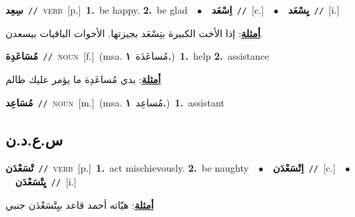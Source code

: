 \documentclass[10pt,a4paper,twoside]{article} %
\begin{document}
\begin{multicols}{2}
{\setlength\topsep{0pt}\textbf{\foreignlanguage{arabic}{سِعِد}}\ {\color{gray}\texttt{//}\color{black}}\ \textsc{verb}\ [p.]\ \textbf{1.}~be happy.  \textbf{2.}~be glad\ \ $\bullet$\ \ \setlength\topsep{0pt}\textbf{\foreignlanguage{arabic}{اِسْعَد}}\ {\color{gray}\texttt{//}\color{black}}\ [c.]\ \ $\bullet$\ \ \setlength\topsep{0pt}\textbf{\foreignlanguage{arabic}{يِسْعَد}}\ {\color{gray}\texttt{//}\color{black}}\ [i.]\  \begin{flushright}\color{gray}\foreignlanguage{arabic}{\textbf{\underline{\foreignlanguage{arabic}{أمثلة}}}: إذا الأخت الكبيرة بتِسْعَد بجيزتها. الأخوات الباقيات بيسعدن.}\end{flushright}\color{black}} \vspace{2mm}

{\setlength\topsep{0pt}\textbf{\foreignlanguage{arabic}{مُسَاعَدِة}}\ {\color{gray}\texttt{//}\color{black}}\ \textsc{noun}\ [f.]\ \color{gray}(msa. \foreignlanguage{arabic}{مُساعَدَة}~\foreignlanguage{arabic}{\textbf{١.}})\color{black}\ \textbf{1.}~help  \textbf{2.}~assistance\  \begin{flushright}\color{gray}\foreignlanguage{arabic}{\textbf{\underline{\foreignlanguage{arabic}{أمثلة}}}: بدي مُساعَدِة ما يؤمر عليك ظالم}\end{flushright}\color{black}} \vspace{2mm}

{\setlength\topsep{0pt}\textbf{\foreignlanguage{arabic}{مُسَاعِد}}\ {\color{gray}\texttt{//}\color{black}}\ \textsc{noun}\ [m.]\ \color{gray}(msa. \foreignlanguage{arabic}{مُساعِد}~\foreignlanguage{arabic}{\textbf{١.}})\color{black}\ \textbf{1.}~assistant\ } \vspace{2mm}

\vspace{-3mm}
\subsection*{\color{blue}\foreignlanguage{arabic}{س.ع.د.ن}\color{blue}{}} 

{\setlength\topsep{0pt}\textbf{\foreignlanguage{arabic}{تْسَعْدَن}}\ {\color{gray}\texttt{//}\color{black}}\ \textsc{verb}\ [p.]\ \textbf{1.}~act mischievously.  \textbf{2.}~be naughty\ \ $\bullet$\ \ \setlength\topsep{0pt}\textbf{\foreignlanguage{arabic}{اِتْسَعْدَن}}\ {\color{gray}\texttt{//}\color{black}}\ [c.]\ \ $\bullet$\ \ \setlength\topsep{0pt}\textbf{\foreignlanguage{arabic}{يِتْسَعْدَن}}\ {\color{gray}\texttt{//}\color{black}}\ [i.]\  \begin{flushright}\color{gray}\foreignlanguage{arabic}{\textbf{\underline{\foreignlanguage{arabic}{أمثلة}}}: هيّاته أحمد قاعد بيِتْسَعْدَن جنبي}\end{flushright}\color{black}} \vspace{2mm}


\end{multicols}
\end{document}
